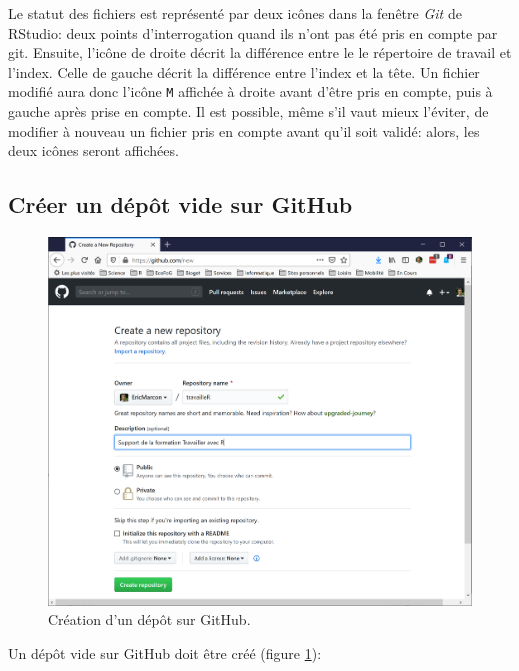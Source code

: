 \documentclass[
  12pt,
  french,
  a4paper,
  extrafontsizes,onecolumn,openright
  ]{memoir}
\begin{document}
\normalsize

Le statut des fichiers est représenté par deux icônes dans la fenêtre \emph{Git} de RStudio: deux points d'interrogation quand ils n'ont pas été pris en compte par git.
Ensuite, l'icône de droite décrit la différence entre le le répertoire de travail et l'index.
Celle de gauche décrit la différence entre l'index et la tête.
Un fichier modifié aura donc l'icône \texttt{M} affichée à droite avant d'être pris en compte, puis à gauche après prise en compte.
Il est possible, même s'il vaut mieux l'éviter, de modifier à nouveau un fichier pris en compte avant qu'il soit validé: alors, les deux icônes seront affichées.

\hypertarget{cruxe9er-un-duxe9puxf4t-vide-sur-github}{%
\subsection{Créer un dépôt vide sur GitHub}\label{cruxe9er-un-duxe9puxf4t-vide-sur-github}}



\scriptsize

\begin{figure}

{\centering \includegraphics[width=0.8\linewidth]{images/CreateRepo} 

}

\caption{Création d'un dépôt sur GitHub.}\label{fig:CreateRepo}
\end{figure}

\normalsize

Un dépôt vide sur GitHub doit être créé (figure \ref{fig:CreateRepo}):
\end{document}
